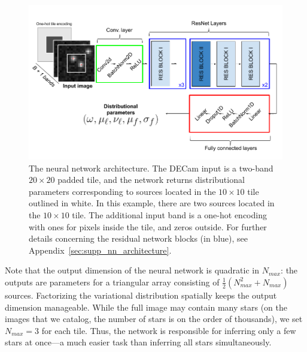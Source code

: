 \begin{figure}[!tb]
    \centering
    \includegraphics[width=\textwidth]{figures_vg/starnet_archetecture9.png}
    \caption{The neural network architecture. The DECam input is a two-band $20\times 20$ padded tile, 
    and the network returns distributional parameters corresponding to sources located in the $10\times 10$ tile outlined in white.
    In this example, there are two sources located in the $10\times10$ tile.
    The additional input band is a one-hot encoding with ones for pixels inside the tile, and zeros outside. 
    For further details concerning the residual network blocks (in blue), see 
    Appendix~\ref{sec:supp_nn_architecture}.
    }
    \label{fig:starnet_arch}
\end{figure}



Note that the output dimension of the neural network is quadratic in $N_{max}$: the outputs are parameters for a triangular array consisting of $\frac{1}{2}(N_{max}^2 + N_{max})$ sources.
Factorizing the variational distribution spatially keeps the output dimension manageable.
While the full image may contain many stars
(on the images that we catalog, the number of stars is on the order of thousands),
we set $N_{max} = 3$ for each tile.
Thus, the network is responsible for inferring only a few stars at once---a much easier task than inferring all stars simultaneously.

